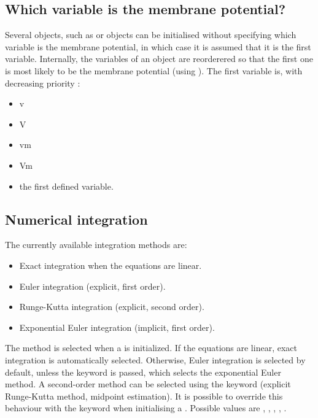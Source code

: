 \documentclass[letterpaper,10pt,english]{manual}
\begin{document}
\subsection{Which variable is the membrane potential?}

Several objects, such as \hyperlink{brian.Threshold}{} or \hyperlink{brian.Reset}{} objects
can be initialised without specifying which variable is the membrane potential, in which
case it is assumed that it is the first variable.
Internally, the variables of an \hyperlink{brian.Equations}{} object are reorderered so that the first one
is most likely to be the membrane potential (using ).
The first variable is, with decreasing priority :
\begin{itemize}
\item {} 
v

\item {} 
V

\item {} 
vm

\item {} 
Vm

\item {} 
the first defined variable.

\end{itemize}
\hypertarget{numerical-integration}{}

\subsection{Numerical integration}

The currently available integration methods are:
\begin{itemize}
\item {} 
Exact integration when the equations are linear.

\item {} 
Euler integration (explicit, first order).

\item {} 
Runge-Kutta integration (explicit, second order).

\item {} 
Exponential Euler integration (implicit, first order).

\end{itemize}

The method is selected when a \hyperlink{brian.NeuronGroup}{} is initialized.
If the equations are linear, exact integration is automatically selected.
Otherwise, Euler integration is selected by default, unless the keyword
 is passed, which selects the exponential Euler method. A second-order method
can be selected using the keyword  (explicit Runge-Kutta method, midpoint estimation).
It is possible to override this behaviour with the  keyword when initialising
a \hyperlink{brian.NeuronGroup}{}. Possible values are , ,
, , .
\end{document}
